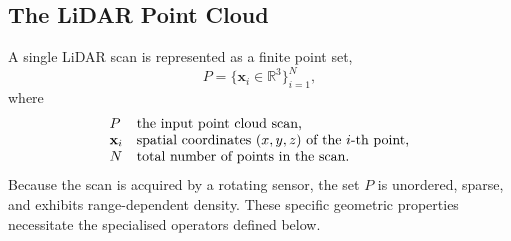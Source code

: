 \subsection{The LiDAR Point Cloud}
\label{sec:th-notation}
A single LiDAR scan is represented as a finite point set,
\begin{equation}
  P = \{\mathbf{x}_i \in \mathbb{R}^3\}_{i=1}^{N} ,
  \label{eq:pointset}
\end{equation}
where
\[
  \begin{array}{@{}l@{\quad}l@{}}
    P & \text{the input point cloud scan,}\\
    \mathbf{x}_i & \text{spatial coordinates } (x, y, z) \text{ of the } i\text{-th point,}\\
    N & \text{total number of points in the scan.}
  \end{array}
\]
Because the scan is acquired by a rotating sensor, the set $P$ is unordered, sparse, and
exhibits range-dependent density. These specific geometric properties necessitate the
specialised operators defined below.

